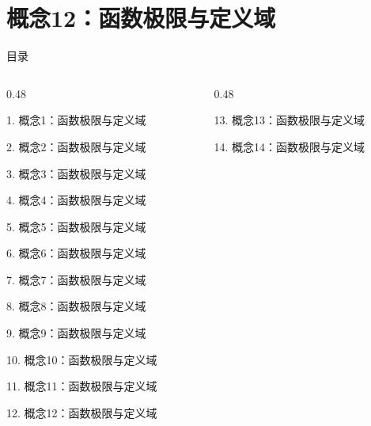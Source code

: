 \documentclass[aspectratio=169,10pt,fontset=fandol]{ctexbeamer}
\begin{document}
\section{概念12：函数极限与定义域}
\begin{frame}[t,fragile]{目录}
\small
\begin{columns}[T,onlytextwidth]
\begin{column}{0.48\textwidth}
{\color{black}\small 1. 概念1：函数极限与定义域\par}\vspace{0.22em}
{\color{black}\small 2. 概念2：函数极限与定义域\par}\vspace{0.22em}
{\color{black}\small 3. 概念3：函数极限与定义域\par}\vspace{0.22em}
{\color{black}\small 4. 概念4：函数极限与定义域\par}\vspace{0.22em}
{\color{black}\small 5. 概念5：函数极限与定义域\par}\vspace{0.22em}
{\color{black}\small 6. 概念6：函数极限与定义域\par}\vspace{0.22em}
{\color{black}\small 7. 概念7：函数极限与定义域\par}\vspace{0.22em}
{\color{black}\small 8. 概念8：函数极限与定义域\par}\vspace{0.22em}
{\color{black}\small 9. 概念9：函数极限与定义域\par}\vspace{0.22em}
{\color{black}\small 10. 概念10：函数极限与定义域\par}\vspace{0.22em}
{\color{black}\small 11. 概念11：函数极限与定义域\par}\vspace{0.22em}
{\color{blue}\small 12. 概念12：函数极限与定义域\par}\vspace{0.22em}
\end{column}
\begin{column}{0.48\textwidth}
{\color{gray!40}\small 13. 概念13：函数极限与定义域\par}\vspace{0.22em}
{\color{gray!40}\small 14. 概念14：函数极限与定义域\par}\vspace{0.22em}

\end{column}
\end{columns}
\end{frame}
\end{document}
